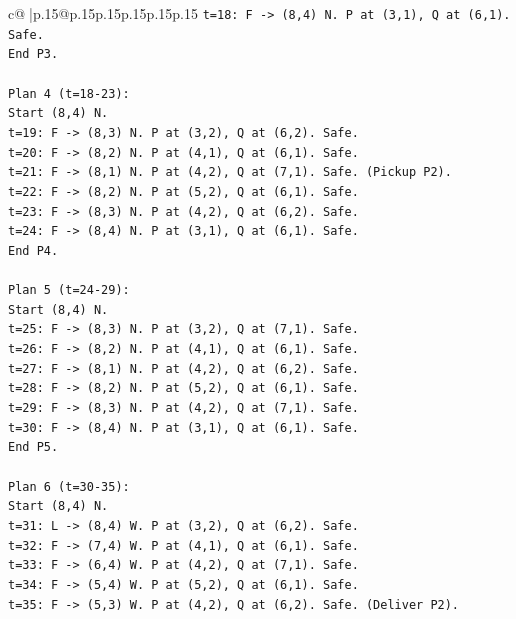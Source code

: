\documentclass{article}
\begin{document}
{\begin{supertabular}{c@{$\;$}|p{.15\linewidth}@{}p{.15\linewidth}p{.15\linewidth}p{.15\linewidth}p{.15\linewidth}p{.15\linewidth}}
{{{\texttt{t=18: F {-}> (8,4) N. P at (3,1), Q at (6,1). Safe.} \\
\texttt{End P3.} \\
\\ 
\texttt{Plan 4 (t=18{-}23):} \\
\texttt{Start (8,4) N.} \\
\texttt{t=19: F {-}> (8,3) N. P at (3,2), Q at (6,2). Safe.} \\
\texttt{t=20: F {-}> (8,2) N. P at (4,1), Q at (6,1). Safe.} \\
\texttt{t=21: F {-}> (8,1) N. P at (4,2), Q at (7,1). Safe. (Pickup P2).} \\
\texttt{t=22: F {-}> (8,2) N. P at (5,2), Q at (6,1). Safe.} \\
\texttt{t=23: F {-}> (8,3) N. P at (4,2), Q at (6,2). Safe.} \\
\texttt{t=24: F {-}> (8,4) N. P at (3,1), Q at (6,1). Safe.} \\
\texttt{End P4.} \\
\\ 
\texttt{Plan 5 (t=24{-}29):} \\
\texttt{Start (8,4) N.} \\
\texttt{t=25: F {-}> (8,3) N. P at (3,2), Q at (7,1). Safe.} \\
\texttt{t=26: F {-}> (8,2) N. P at (4,1), Q at (6,1). Safe.} \\
\texttt{t=27: F {-}> (8,1) N. P at (4,2), Q at (6,2). Safe.} \\
\texttt{t=28: F {-}> (8,2) N. P at (5,2), Q at (6,1). Safe.} \\
\texttt{t=29: F {-}> (8,3) N. P at (4,2), Q at (7,1). Safe.} \\
\texttt{t=30: F {-}> (8,4) N. P at (3,1), Q at (6,1). Safe.} \\
\texttt{End P5.} \\
\\ 
\texttt{Plan 6 (t=30{-}35):} \\
\texttt{Start (8,4) N.} \\
\texttt{t=31: L {-}> (8,4) W. P at (3,2), Q at (6,2). Safe.} \\
\texttt{t=32: F {-}> (7,4) W. P at (4,1), Q at (6,1). Safe.} \\
\texttt{t=33: F {-}> (6,4) W. P at (4,2), Q at (7,1). Safe.} \\
\texttt{t=34: F {-}> (5,4) W. P at (5,2), Q at (6,1). Safe.} \\
\texttt{t=35: F {-}> (5,3) W. P at (4,2), Q at (6,2). Safe. (Deliver P2).} \\
}}}
\end{supertabular}}
\end{document}
